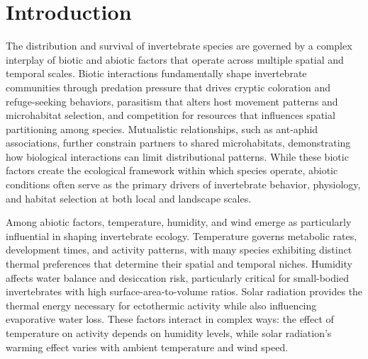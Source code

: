 \usepackage{hyperref}
\usepackage{longtable}

\chapter{Introduction}
\label{ch:introduction}


The distribution and survival of invertebrate species are governed by a complex interplay of biotic and abiotic factors that operate across multiple spatial and temporal scales. Biotic interactions fundamentally shape invertebrate communities through predation pressure that drives cryptic coloration and refuge-seeking behaviors, parasitism that alters host movement patterns and microhabitat selection, and competition for resources that influences spatial partitioning among species. Mutualistic relationships, such as ant-aphid associations, further constrain partners to shared microhabitats, demonstrating how biological interactions can limit distributional patterns. %
While these biotic factors create the ecological framework within which species operate, abiotic conditions often serve as the primary drivers of invertebrate behavior, physiology, and habitat selection at both local and landscape scales.

Among abiotic factors, temperature, humidity, and wind emerge as particularly influential in shaping invertebrate ecology. Temperature governs metabolic rates, development times, and activity patterns, with many species exhibiting distinct thermal preferences that determine their spatial and temporal niches. Humidity affects water balance and desiccation risk, particularly critical for small-bodied invertebrates with high surface-area-to-volume ratios. Solar radiation provides the thermal energy necessary for ectothermic activity while also influencing evaporative water loss. These factors interact in complex ways: the effect of temperature on activity depends on humidity levels, while solar radiation's warming effect varies with ambient temperature and wind speed.


